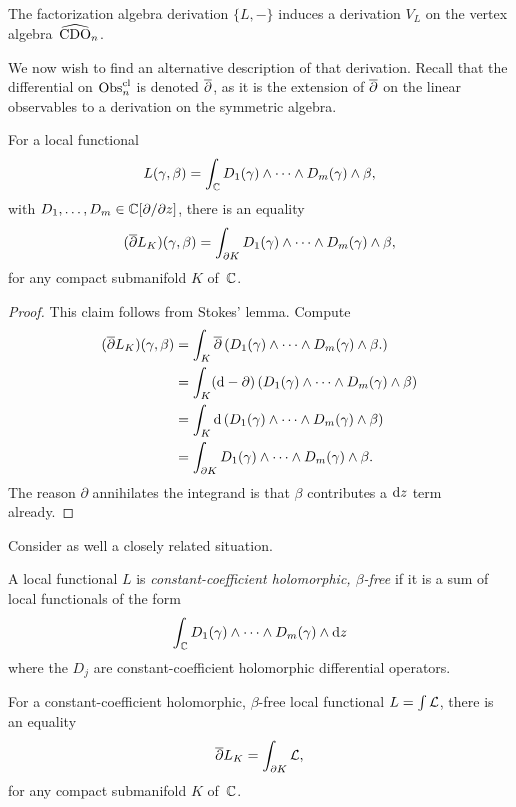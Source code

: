 \begin{lemma}
The factorization algebra derivation $\{L,-\}$ induces a derivation $V_L$ on the vertex algebra~$\widehat{\rm CDO}_n$.
\end{lemma}

We now wish to find an alternative description of that derivation.
Recall that the differential on ${\rm Obs}^{\rm cl}_n$ is denoted $\overline{\partial}$, 
as it is the extension of $\overline{\partial}$ on the linear observables to a derivation on the symmetric algebra.

\begin{lemma}
For a local functional
\[
L(\gamma,\beta) = \int_\mathbb C D_1(\gamma) \wedge \cdots \wedge D_m(\gamma) \wedge \beta,
\]
with $D_1,\ldots,D_m \in \mathbb C[\partial/\partial z]$, there is an equality
\[
(\overline{\partial} L_K)(\gamma,\beta) = \int_{\partial K} D_1(\gamma) \wedge \cdots \wedge D_m(\gamma) \wedge \beta,
\]
for any compact submanifold $K$ of~$\mathbb C$.
\end{lemma}

\begin{proof}
This claim follows from Stokes' lemma.
Compute
\begin{align*}
(\overline{\partial} L_K)(\gamma,\beta) 
&= \int_K \overline{\partial} \left( D_1(\gamma) \wedge \cdots \wedge D_m(\gamma) \wedge \beta. \right)\\
&= \int_K ({\rm d} - \partial) \left( D_1(\gamma) \wedge \cdots \wedge D_m(\gamma) \wedge \beta \right)\\
&= \int_K {\rm d} \left( D_1(\gamma) \wedge \cdots \wedge D_m(\gamma) \wedge \beta \right)\\
&= \int_{\partial K} D_1(\gamma) \wedge \cdots \wedge D_m(\gamma) \wedge \beta.
\end{align*}
The reason $\partial$ annihilates the integrand is that $\beta$ contributes a ${\rm d} z$ term already.
\end{proof}

Consider as well a closely related situation.

\begin{dfn}
A local functional $L$ is {\em constant-coefficient holomorphic, $\beta$-free} if it is a sum of local functionals of the form
\[
\int_\mathbb C D_1(\gamma) \wedge \cdots \wedge D_m(\gamma) \wedge {\rm d} z
\]
where the $D_j$ are constant-coefficient holomorphic differential operators.
\end{dfn}

\begin{lemma}
For a constant-coefficient holomorphic, $\beta$-free local functional $L = \int \mathcal L$,
there is an equality
\[
\overline{\partial} L_K = \int_{\partial K} \mathcal L,
\]
for any compact submanifold $K$ of~$\mathbb C$.
\end{lemma}

